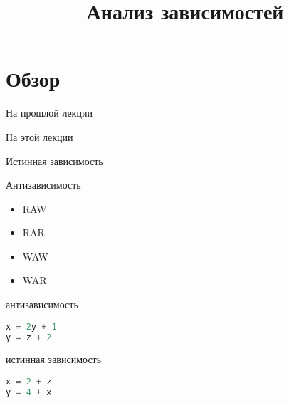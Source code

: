 

\title{Анализ зависимостей}



\begin{frame}
\titlepage
\end{frame}

\section*{Обзор}

\begin{frame}{На прошлой лекции}
\end{frame}

\begin{frame}{На этой лекции}
\tableofcontents
\end{frame} 


\begin{frame}

Истинная зависимость

Антизависимость

\end{frame}

\begin{frame}

\begin{itemize}
  \item RAW
  \item RAR
  \item WAW
  \item WAR
\end{itemize}

\end{frame}

\begin{frame}[fragile]

антизависимость

\begin{lstlisting}[language=C,basicstyle=\ttfamily,keywordstyle=\color{blue},basicstyle=\scriptsize]
x = 2y + 1
y = z + 2
\end{lstlisting}

\end{frame}

\begin{frame}[fragile]

истинная зависимость

\begin{lstlisting}[language=C,basicstyle=\ttfamily,keywordstyle=\color{blue},basicstyle=\scriptsize]
x = 2 + z
y = 4 + x
\end{lstlisting}

\end{frame}


